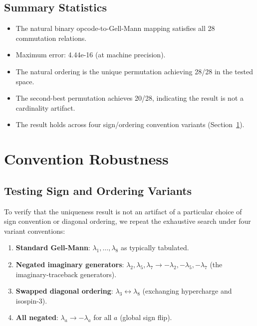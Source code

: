 \documentclass[11pt,a4paper]{article}
\begin{document}
\subsection{Summary Statistics}

\begin{itemize}
  \item The natural binary opcode-to-Gell-Mann mapping satisfies all 28 commutation relations.
  \item Maximum error: 4.44e-16 (at machine precision).
  \item The natural ordering is the unique permutation achieving 28/28 in the tested space.
  \item The second-best permutation achieves 20/28, indicating the result is not a cardinality artifact.
  \item The result holds across four sign/ordering convention variants (Section~\ref{sec:convention}).
\end{itemize}

\section{Convention Robustness}\label{sec:convention}

\subsection{Testing Sign and Ordering Variants}

To verify that the uniqueness result is not an artifact of a particular choice of sign convention or diagonal ordering, we repeat the exhaustive search under four variant conventions:

\begin{enumerate}
  \item \textbf{Standard Gell-Mann}: $\lambda_1, \ldots, \lambda_8$ as typically tabulated.

  \item \textbf{Negated imaginary generators}: $\lambda_2, \lambda_5, \lambda_7 \to -\lambda_2, -\lambda_5, -\lambda_7$ (the imaginary-traceback generators).

  \item \textbf{Swapped diagonal ordering}: $\lambda_3 \leftrightarrow \lambda_8$ (exchanging hypercharge and isospin-3).

  \item \textbf{All negated}: $\lambda_a \to -\lambda_a$ for all $a$ (global sign flip).
\end{enumerate}
\end{document}
